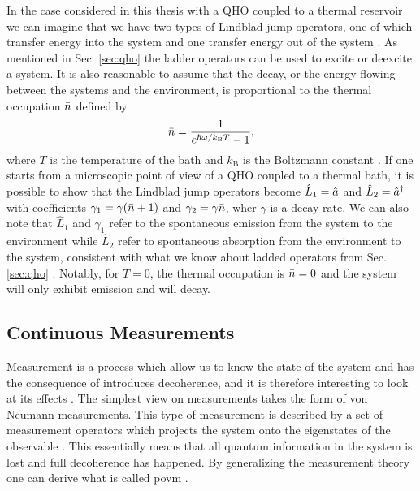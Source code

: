 In the case considered in this thesis with a QHO coupled to a thermal reservoir we can imagine that we have two types of Lindblad jump operators, one of which transfer energy into the system and one transfer energy out of the system \cite{Meystre:2021}. As mentioned in Sec. \ref{sec:qho} the ladder operators can be used to excite or deexcite a system. It is also reasonable to assume that the decay, or the energy flowing between the systems and the environment, is proportional to the thermal occupation $\bar{n}$ defined by
\begin{equation}
    \bar{n} = \frac{1}{e^{\hbar\omega/ k_\mathrm{B}T} - 1},
\end{equation}
where $T$ is the temperature of the bath and $k_\mathrm{B}$ is the Boltzmann constant \cite{Meystre:2021}. If one starts from a microscopic point of view of a QHO coupled to a thermal bath, it is possible to show that the Lindblad jump operators become $\hat{L}_1 = \hat{a}$ and $\hat{L}_2 = \hat{a}^{\dagger}$ with coefficients $\gamma_1 = \gamma(\bar{n} + 1)$ and $\gamma_2 = \gamma \bar{n}$, wher $\gamma$ is a decay rate. We can also note that $\hat{L}_1$ and $\gamma_1$ refer to the spontaneous emission from the system to the environment while $\hat{L}_2$ refer to spontaneous absorption from the environment to the system, consistent with what we know about ladded operators from Sec. \ref{sec:qho} \cite{Meystre:2021}. Notably, for $T=0$, the thermal occupation is $\bar{n} = 0$ and the system will only exhibit emission and will decay.


\subsection{Continuous Measurements}
Measurement is a process which allow us to know the state of the system and has the consequence of introduces decoherence, and it is therefore interesting to look at its effects \cite{Jordan:2024}. The simplest view on measurements takes the form of von Neumann measurements. This type of measurement is described by a set of measurement operators which projects the system onto the eigenstates of the observable \cite{Annby-Andersson:2024}. This essentially means that all quantum information in the system is lost and full decoherence has happened. By generalizing the measurement theory one can derive what is called \gls{povm} \cite{Annby-Andersson:2024}.

